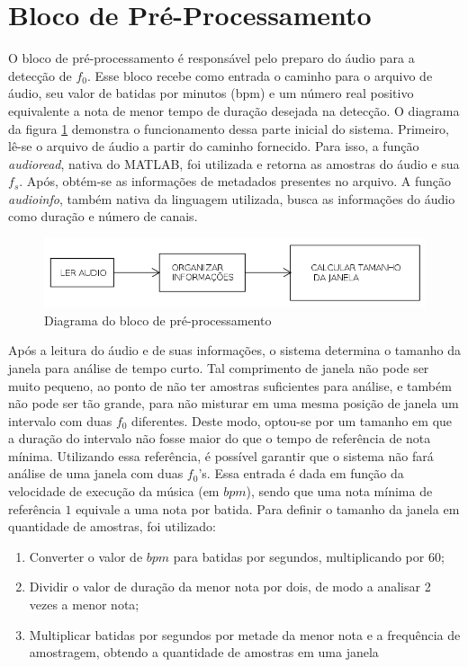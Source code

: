 \section{Bloco de Pré-Processamento}

O bloco de pré-processamento é responsável pelo preparo do áudio para a detecção de $f_0$. Esse bloco recebe como entrada o caminho para o arquivo de áudio, seu valor de batidas por minutos (bpm) e um número real positivo equivalente a nota de menor tempo de duração desejada na detecção. O diagrama da figura \ref{flowchart-preprocessing} demonstra o funcionamento dessa parte inicial do sistema. Primeiro, lê-se o arquivo de áudio a partir do caminho fornecido. Para isso, a função \textit{audioread}, nativa do MATLAB\rreg, foi utilizada e retorna as amostras do áudio e sua $f_s$. Após, obtém-se as informações de metadados presentes no arquivo. A função \textit{audioinfo}, também nativa da linguagem utilizada, busca as informações do áudio como duração e número de canais. 

\begin{figure}[h]
	\centering
	\includegraphics[width=\linewidth]{pasta1_figuras/preprocessing.png}
	\caption{Diagrama do bloco de pré-processamento}
	\label{flowchart-preprocessing}
\end{figure}

Após a leitura do áudio e de suas informações, o sistema determina o tamanho da janela para análise de tempo curto. Tal comprimento de janela não pode ser muito pequeno, ao ponto de não ter amostras suficientes para análise, e também não pode ser tão grande, para não misturar em uma mesma posição de janela um intervalo com duas $f_0$ diferentes. Deste modo, optou-se por um tamanho em que a duração do intervalo não fosse maior do que o tempo de referência de nota mínima. Utilizando essa referência, é possível garantir que o sistema não fará análise de uma janela com duas $f_0$'s. Essa entrada é dada em função da velocidade de execução da música (em $bpm$), sendo que uma nota mínima de referência $1$ equivale a uma nota por batida. Para definir o tamanho da janela em quantidade de amostras, foi utilizado:

\begin{enumerate}
	\item Converter o valor de $bpm$ para batidas por segundos, multiplicando por 60;
	\item Dividir o valor de duração da menor nota por dois, de modo a analisar 2 vezes a menor nota;
	\item Multiplicar batidas por segundos por metade da menor nota e a frequência de amostragem, obtendo a quantidade de amostras em uma janela
\end{enumerate}

